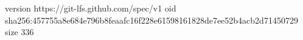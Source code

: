 version https://git-lfs.github.com/spec/v1
oid sha256:457755a8e684e796b8feaafc16f228e61598161828de7ee52b4acb2d71450729
size 336

